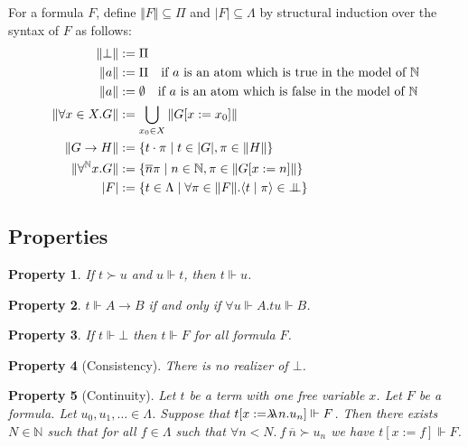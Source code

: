 \documentclass{article}
\newcommand{\N}{\mathbb{N}}
\newcommand{\proc}[2]{\langle{#1}\mid{#2}\rangle}
\newcommand{\depforall}[1]{\forall^\N #1.}
\newcommand{\pole}{\bot\mkern-10mu\bot}
\newcommand{\realizes}{\Vdash}
\newcommand{\oracle}[2]{\lambda\mkern-15mu\lambda\ #1. #2}
\newtheorem{property}{Property}
\begin{document}
For a formula $F$, define $\Vert F \Vert \subseteq \Pi$ and $\vert F \vert \subseteq \Lambda$ by structural induction over the syntax of $F$ as follows:
\begin{align*}
    \Vert \bot \Vert & := \Pi \\
    \Vert a \Vert & := \Pi\ \ \ \text{if $a$ is an atom which is true in the model of $\N$} \\
    \Vert a \Vert & := \emptyset\ \ \ \text{if $a$ is an atom which is false in the model of $\N$} \\
    \Vert \forall x \in X. G \Vert & := \bigcup_{x_0 \in X} \Vert G[x := x_0] \Vert \\
    \Vert G \rightarrow H \Vert & := \{ t\cdot\pi \mid t \in \vert G \vert, \pi \in \Vert H \Vert \} \\
    \Vert \depforall{x} G \Vert & := \{ \overline{n}\pi \mid n \in \N, \pi \in \Vert G[x := n] \Vert \} \\
    \vert F \vert & := \{ t \in \Lambda \mid \forall \pi \in \Vert F \Vert. \proc{t}{\pi} \in \pole \}
\end{align*}

\subsection{Properties}

\begin{property}
    If $t \succ u$ and $u \realizes t$, then $t \realizes u$.
\end{property}

\begin{property}\label{impliesintro}
    $t \realizes A \rightarrow B$ if and only if $\forall u \realizes A. t u \realizes B$.
\end{property}

\begin{property}
    If $t \realizes \bot$ then $t \realizes F$ for all formula $F$.
\end{property}

\begin{property}[Consistency]
    There is no realizer of $\bot$.
\end{property}

\begin{property}[Continuity]
    Let $t$ be a term with one free variable $x$.
    Let $F$ be a formula.
    Let $u_0, u_1, \dots \in \Lambda$.
    Suppose that $t[x := \oracle{n}{u_n}] \realizes F$.
    Then there exists $N \in \N$ such that for all $f \in \Lambda$ such that $\forall n < N.\ f\ \overline{n} \succ u_n$ we have $t[x := f] \realizes F$.
\end{property}
\end{document}
